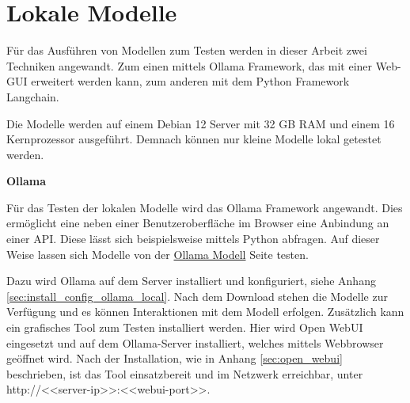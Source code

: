 
\section{Lokale Modelle}
Für das Ausführen von Modellen zum Testen werden in dieser Arbeit zwei Techniken angewandt. Zum einen mittels Ollama Framework, das mit einer Web-GUI erweitert werden kann, zum anderen mit dem Python Framework Langchain.\vspace{0.2cm}

Die Modelle werden auf einem Debian 12 Server mit 32 GB RAM und einem 16 Kernprozessor ausgeführt. Demnach können nur kleine Modelle lokal getestet werden.\vspace{0.2cm}

\textbf{Ollama}\vspace{0.2cm}

Für das Testen der lokalen Modelle wird das Ollama Framework angewandt. Dies ermöglicht eine neben einer Benutzeroberfläche im Browser eine Anbindung an einer API. Diese lässt sich beispielsweise mittels Python abfragen. Auf dieser Weise lassen sich Modelle von der \href{https://ollama.com/search}{Ollama Modell} Seite testen.\vspace{0.2cm}

Dazu wird Ollama auf dem Server installiert und konfiguriert, siehe Anhang \ref{sec:install_config_ollama_local}. Nach dem Download stehen die Modelle zur Verfügung und es können Interaktionen mit dem Modell erfolgen. Zusätzlich kann ein grafisches Tool zum Testen installiert werden. Hier wird Open WebUI eingesetzt und auf dem Ollama-Server installiert, welches mittels Webbrowser geöffnet wird. Nach der Installation, wie in Anhang \ref{sec:open_webui} beschrieben, ist das Tool einsatzbereit und im Netzwerk erreichbar, unter http://<<server-ip>>:<<webui-port>>.\vspace{0.2cm}

